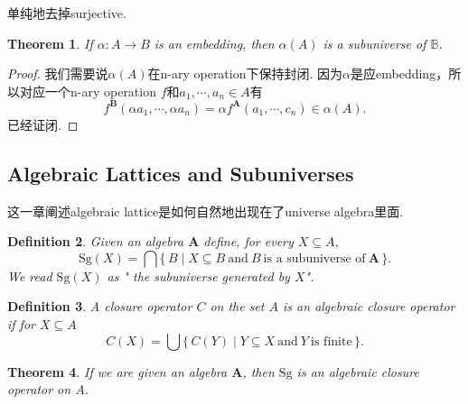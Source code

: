 \documentclass{article}
\newtheorem{theorem}{Theorem}[section]
\newtheorem{definition}[theorem]{Definition}
\newcommand*{\xfunc}[4]{{#2}\colon{#3}{#1}{#4}}
\newcommand*{\func}[3]{\xfunc{\to}{#1}{#2}{#3}}
\newcommand\Set[2]{\{\,#1\mid#2\,\}} %
\newcommand\Sg{\text{Sg}}
\begin{document}
{\color{blue} 单纯地去掉surjective.}

\begin{theorem}
If $\func{\alpha}{A}{B}$ is an embedding, then $\alpha(A)$ is a subuniverse of $\mathbb{B}$.
\end{theorem}

\begin{proof}
我们需要说$\alpha(A)$在n-ary operation下保持封闭. 因为$\alpha$是应embedding，所以对应一个n-ary operation $f$和$a_1,\cdots,a_n \in A$有
$$
f^\mathbf{B}(\alpha a_1,\cdots,\alpha a_n) = \alpha f^\mathbf{A}(a_1,\cdots,c_n) \in \alpha(A).
$$
已经证闭.
\end{proof}

\newpage
\subsection{Algebraic Lattices and Subuniverses}

{\color{red} 这一章阐述algebraic lattice是如何自然地出现在了universe algebra里面}.

\begin{definition}
\rm Given an algebra $\mathbf{A}$ define, for every $X \subseteq A$,
$$
\Sg(X) = \bigcap \Set{B}{X \subseteq B\ \text{and}\ B\ \text{is a subuniverse of}\ \mathbf{A}}.
$$ 
We read $\Sg(X)$ as "{\color{red} the subuniverse generated by $X$}".
\end{definition}

\begin{definition}
\rm A closure operator $C$ on the set $A$ is an {\color{red} algebraic closure  operator} if for $X \subseteq A$
$$
C(X) = \bigcup\Set{C(Y)}{Y \subseteq X\ \text{and}\ Y\ \text{is finite}}.
$$
\end{definition}

\begin{theorem}
\rm If we are given an algebra $\mathbf{A}$, then {\color{red} $\Sg$ is an algebraic closure operator} on $A$.
\end{theorem}
\end{document}
